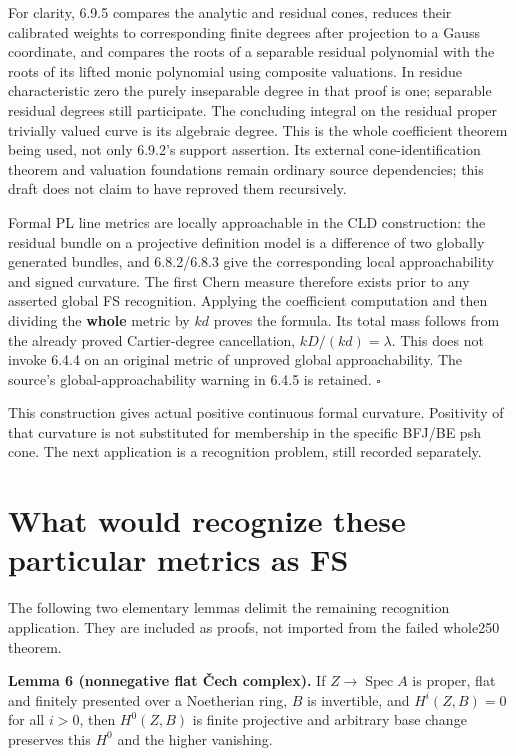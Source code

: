 \documentclass[
  11pt,
]{article}
\begin{document}
For clarity, 6.9.5 compares the analytic and residual cones, reduces
their calibrated weights to corresponding finite degrees after
projection to a Gauss coordinate, and compares the roots of a separable
residual polynomial with the roots of its lifted monic polynomial using
composite valuations. In residue characteristic zero the purely
inseparable degree in that proof is one; separable residual degrees
still participate. The concluding integral on the residual proper
trivially valued curve is its algebraic degree. This is the whole
coefficient theorem being used, not only 6.9.2's support assertion. Its
external cone-identification theorem and valuation foundations remain
ordinary source dependencies; this draft does not claim to have reproved
them recursively.

Formal PL line metrics are locally approachable in the CLD construction:
the residual bundle on a projective definition model is a difference of
two globally generated bundles, and 6.8.2/6.8.3 give the corresponding
local approachability and signed curvature. The first Chern measure
therefore exists prior to any asserted global FS recognition. Applying
the coefficient computation and then dividing the \textbf{whole} metric
by \(kd\) proves the formula. Its total mass follows from the already
proved Cartier-degree cancellation, \(kD/(kd)=\lambda\). This does not
invoke 6.4.4 on an original metric of unproved global approachability.
The source's global-approachability warning in 6.4.5 is retained.
\(\square\)

This construction gives actual positive continuous formal curvature.
Positivity of that curvature is not substituted for membership in the
specific BFJ/BE psh cone. The next application is a recognition problem,
still recorded separately.

\section{What would recognize these particular metrics as
FS}\label{what-would-recognize-these-particular-metrics-as-fs}

The following two elementary lemmas delimit the remaining recognition
application. They are included as proofs, not imported from the failed
whole250 theorem.

\textbf{Lemma 6 (nonnegative flat Čech complex).} If
\(Z\to\operatorname{Spec}A\) is proper, flat and finitely presented over
a Noetherian ring, \(B\) is invertible, and \(H^i(Z,B)=0\) for all
\(i>0\), then \(H^0(Z,B)\) is finite projective and arbitrary base
change preserves this \(H^0\) and the higher vanishing.
\end{document}
